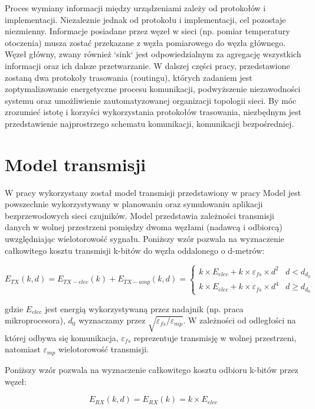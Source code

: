 \documentclass[a4paper,12pt,twoside,openany]{report}
\begin{document}
Proces wymiany informacji między urządzeniami zależy od protokołów i implementacji.
Niezaleznie jednak od protokołu i implementacji, cel pozostaje niezmienny. Informacje posiadane przez węzeł w sieci (np. pomiar temperatury otoczenia) musza zostać przekazane z węzła pomiarowego 
do węzła głównego. Węzeł główny, zwany również `sink` jest odpowiedzialnym za agregację wszystkich informacji oraz ich dalsze przetwarzanie.  
W dalszej części pracy, przedstawione zostaną dwa protokoły trasowania (routingu), których zadaniem jest zoptymalizowanie energetyczne procesu komunikacji, podwyższenie niezawodności systemu 
oraz umożliwienie zautomatyzowanej organizacji topologii sieci.
By móc zrozumieć istotę i korzyści wykorzystania protokołów trasowania, niezbędnym jest przedstawienie najprostrzego schematu komunikacji, komunikacji bezpośredniej.

\section{Model transmisji}

W pracy wykorzystany został model transmisji przedstawiony w pracy %
Model jest powszechnie wykorzystywany w planowaniu oraz symulowaniu aplikacji bezprzewodowych sieci czujników.
Model przedstawia zależności transmisji danych w wolnej przestrzeni pomiędzy dwoma węzłami (nadawcą i odbiorcą) uwzględniając wielotorowość sygnału.
Poniższy wzór pozwala na wyznaczenie całkowitego kosztu transmisji k-bitów do węzła oddalonego o d-metrów:

\[
E_{TX}(k,d) = E_{TX-elec}(k) + E_{TX-amp}(k,d) = \begin{cases}
 k \times E_{elec} + k \times \varepsilon_{fs} \times d^2 & d < d_{d_{0}}\\
 k \times E_{elec} + k \times \varepsilon_{fs} \times d^4 & d \geq d_{d_{0}}
\end{cases}
\]

gdzie $E_{elec}$ jest energią wykorzystywaną przez nadajnik (np. praca mikroprocesora), $d_{0}$ wyznaczamy przez $\sqrt{\varepsilon_{fs} / \varepsilon_{mp}}$.
W zależności od odległości na której odbywa się komunikacja, $\varepsilon_{fs}$ reprezentuje transmisję w wolnej przestrzeni, natomiast $\varepsilon_{mp}$
wielotorowość transmisji.

Poniższy wzór pozwala na wyznaczenie całkowitego kosztu odbioru k-bitów przez węzeł:

\[E_{RX}(k,d) = E_{RX}(k) = k \times E_{elec}\]
\end{document}
